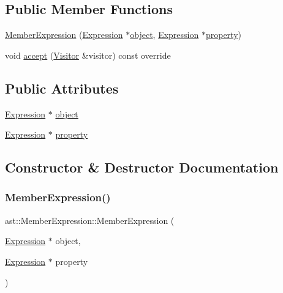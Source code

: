 \subsection*{Public Member Functions}
\begin{DoxyCompactItemize}
\item 
\hyperlink{structast_1_1_member_expression_a059a077f77f83e5c42a16c4e24146858}{Member\+Expression} (\hyperlink{structast_1_1_expression}{Expression} $\ast$\hyperlink{structast_1_1_member_expression_a458905d63f3ce6b483e6d628dad4536a}{object}, \hyperlink{structast_1_1_expression}{Expression} $\ast$\hyperlink{structast_1_1_member_expression_a93f4f0b8c72eb8be2a8feb11bb67361c}{property})
\item 
void \hyperlink{structast_1_1_member_expression_ad56039943b60ae28f37144bf3a343ba6}{accept} (\hyperlink{structast_1_1_visitor}{Visitor} \&visitor) const override
\end{DoxyCompactItemize}
\subsection*{Public Attributes}
\begin{DoxyCompactItemize}
\item 
\hyperlink{structast_1_1_expression}{Expression} $\ast$ \hyperlink{structast_1_1_member_expression_a458905d63f3ce6b483e6d628dad4536a}{object}
\item 
\hyperlink{structast_1_1_expression}{Expression} $\ast$ \hyperlink{structast_1_1_member_expression_a93f4f0b8c72eb8be2a8feb11bb67361c}{property}
\end{DoxyCompactItemize}


\subsection{Constructor \& Destructor Documentation}
\mbox{\label{structast_1_1_member_expression_a059a077f77f83e5c42a16c4e24146858}} 
\subsubsection{\texorpdfstring{Member\+Expression()}{MemberExpression()}}
{\footnotesize\ttfamily ast\+::\+Member\+Expression\+::\+Member\+Expression (\begin{DoxyParamCaption}\item[{\hyperlink{structast_1_1_expression}{Expression} $\ast$}]{object,  }\item[{\hyperlink{structast_1_1_expression}{Expression} $\ast$}]{property }\end{DoxyParamCaption})\hspace{0.3cm}{\ttfamily [inline]}}



